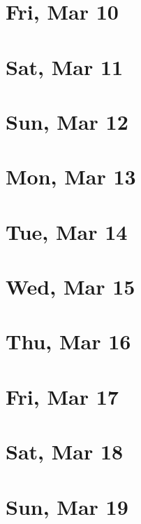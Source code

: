 	\section{Fri, Mar 10}
		
		
	\section{Sat, Mar 11}
		
		
	\section{Sun, Mar 12}
		
		
	\section{Mon, Mar 13}
		
		
	\section{Tue, Mar 14}
		
		
	\section{Wed, Mar 15}
		
		
	\section{Thu, Mar 16}
		
		
	\section{Fri, Mar 17}
		
		
	\section{Sat, Mar 18}
		
		
	\section{Sun, Mar 19}
		
		
